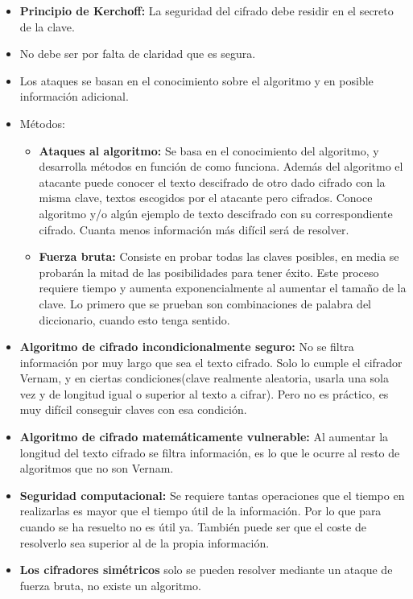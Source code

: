 \documentclass[12pt, twoside, openright]{report} %
\begin{document}
  \begin{itemize}
  \item \textbf{Principio de Kerchoff:} La seguridad del cifrado debe
    residir en el secreto de la clave.
    
  \item No debe ser por falta de claridad que es segura.
    
  \item Los ataques se basan en el conocimiento sobre el algoritmo y en
    posible información adicional.
    
  \item Métodos:
    
    \begin{itemize}
    \item \textbf{Ataques al algoritmo:} Se basa en el conocimiento del
      algoritmo, y desarrolla métodos en función de como funciona.
      Además del algoritmo el atacante puede conocer el texto descifrado
      de otro dado cifrado con la misma clave, textos escogidos por el
      atacante pero cifrados. Conoce algoritmo y/o algún ejemplo de
      texto descifrado con su correspondiente cifrado. Cuanta menos
      información más difícil será de resolver.
      
    \item \textbf{Fuerza bruta:} Consiste en probar todas las claves
      posibles, en media se probarán la mitad de las posibilidades para
      tener éxito. Este proceso requiere tiempo y aumenta
      exponencialmente al aumentar el tamaño de la clave. Lo primero que
      se prueban son combinaciones de palabra del diccionario, cuando
      esto tenga sentido.
      
    \end{itemize}
  \item \textbf{Algoritmo de cifrado incondicionalmente seguro:} No se
    filtra información por muy largo que sea el texto cifrado. Solo lo
    cumple el cifrador Vernam, y en ciertas condiciones(clave realmente
    aleatoria, usarla una sola vez y de longitud igual o superior al
    texto a cifrar). Pero no es práctico, es muy difícil conseguir
    claves con esa condición.
    
  \item \textbf{Algoritmo de cifrado matemáticamente vulnerable:} Al
    aumentar la longitud del texto cifrado se filtra información, es lo
    que le ocurre al resto de algoritmos que no son Vernam.
    
  \item \textbf{Seguridad computacional:} Se requiere tantas operaciones que
    el tiempo en realizarlas es mayor que el tiempo útil de la
    información. Por lo que para cuando se ha resuelto no es útil ya.
    También puede ser que el coste de resolverlo sea superior al de la
    propia información.
    
  \item \textbf{Los cifradores simétricos} solo se pueden resolver mediante
    un ataque de fuerza bruta, no existe un algoritmo.
    
  \end{itemize}
\end{document}
